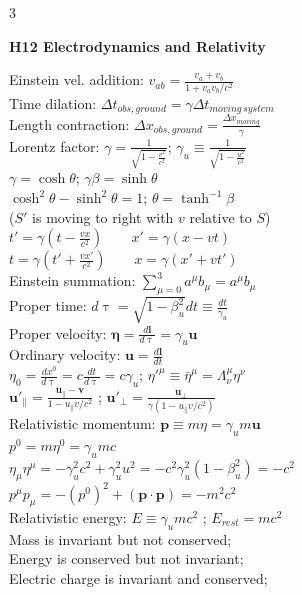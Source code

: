 \documentclass[a4paper,twoside]{article}
\newcommand{\secblock}[1]{%
\par\vspace{3pt}%
\noindent\colorbox{hdrcol}{\parbox[c][1.1em][c]{0.98\linewidth}{\color{white}\bfseries\small #1}}\par
\vspace{2pt}%
}
\begin{document}
\begin{multicols*}{3}
\secblock{H12 Electrodynamics and Relativity}
Einstein vel. addition: \(v_{ab} = \frac{v_a + v_b}{1 + v_a v_b/c^2}\)\\
Time dilation: \(\Delta t_{obs, ground} = \gamma \Delta t_{moving\,system}\)\\
Length contraction: \(\Delta x_{obs, ground} = \frac{\Delta x_{moving}}{\gamma}\)\\
Lorentz factor: \(\gamma = \frac{1}{\sqrt{1 - \frac{v^2}{c^2}}}\); \(\gamma_u \equiv \frac{1}{\sqrt{1 - \frac{u^2}{c^2}}}\)\\
\(\gamma = \cosh\theta\); \(\gamma\beta = \sinh\theta\)\\
\(\cosh^2\theta - \sinh^2\theta = 1\); \(\theta = \tanh^{-1} \beta\)\\
(\(S'\) is moving to right with \(v\) relative to \(S\))\\
\(t' = \gamma (t -  \frac{v x}{c^2}) \qquad x' = \gamma (x - vt) \)\\
\(t = \gamma (t' + \frac{v x'}{c^2}) \qquad x = \gamma (x' + vt') \)\\
Einstein summation: \(\sum_{\mu=0}^3 a^\mu b_\mu = a^\mu b_\mu\)\\
Proper time: \(d\uptau = \sqrt{1 - \beta_u^2}dt \equiv \frac{dt}{\gamma_u}\)\\
Proper velocity: \(\bm \eta = \frac{d\bm l}{d\uptau} = \gamma_u \bm u\) \\
Ordinary velocity: \(\bm u = \frac{d\bm l}{dt}\)\\
\(\eta_0 = \frac{dx^0}{d\uptau} = c \frac{dt}{d\uptau} = c\gamma_u\); \(\eta'^\mu \equiv \bar{\eta}^\mu = \Lambda_\nu^\mu \eta^\nu\)\\
\(\bm u'_\parallel = \frac{\bm u_\parallel-\bm v}{1 - u_\parallel v/c^2}\) ; \(\bm u'_\perp = \frac{\bm u_\perp}{\gamma (1 - u_\parallel v/c^2)}\)\\
Relativistic momentum: \(\bm p \equiv  m \eta =  \gamma_u m \bm u\)\\
\(p^0 = m\eta^0 = \gamma_u mc\)\\
\(\eta_\mu \eta^\mu = - \gamma_u^2 c^2 + \gamma_u^2 u^2 = -c^2\gamma_u^2(1-\beta_u^2) = -c^2\)\\
\(p^\mu p_\mu = -(p^0)^2+ (\bm p \cdot \bm p) = -m^2c^2\)\\
Relativistic energy: \(E \equiv \gamma_u mc^2\) ; \(E_{rest}=mc^2\)\\
Mass is invariant but not conserved;\\
Energy is conserved but not invariant;\\
Electric charge is invariant and conserved;\\

\end{multicols*}
\end{document}
